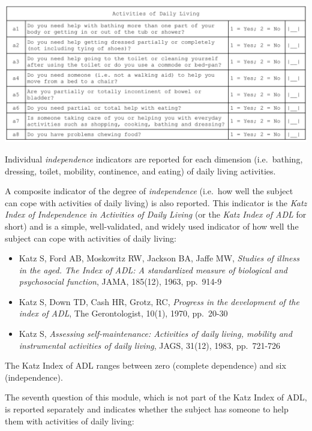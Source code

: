 \documentclass[12pt,a4paper]{book}
\theoremstyle{definition}
\theoremstyle{definition}
\theoremstyle{definition}
\theoremstyle{remark}
\begin{document}
\begin{center}\includegraphics{figures/questionnaire05} \end{center}

Individual \emph{independence} indicators are reported for each
dimension (i.e.~bathing, dressing, toilet, mobility, continence, and
eating) of daily living activities.

A composite indicator of the degree of \emph{independence} (i.e.~how
well the subject can cope with activities of daily living) is also
reported. This indicator is the \emph{Katz Index of Independence in
Activities of Daily Living} (or the \emph{Katz Index of ADL} for short)
and is a simple, well-validated, and widely used indicator of how well
the subject can cope with activities of daily living:

\begin{itemize}
\item
  Katz S, Ford AB, Moskowitz RW, Jackson BA, Jaffe MW, \emph{Studies of
  illness in the aged. The Index of ADL: A standardized measure of
  biological and psychosocial function}, JAMA, 185(12), 1963, pp.~914-9
\item
  Katz S, Down TD, Cash HR, Grotz, RC, \emph{Progress in the development
  of the index of ADL}, The Gerontologist, 10(1), 1970, pp.~20-30
\item
  Katz S, \emph{Assessing self-maintenance: Activities of daily living,
  mobility and instrumental activities of daily living}, JAGS, 31(12),
  1983, pp.~721-726
\end{itemize}

The Katz Index of ADL ranges between zero (complete dependence) and six
(independence).

\newpage

The seventh question of this module, which is not part of the Katz Index
of ADL, is reported separately and indicates whether the subject has
someone to help them with activities of daily living:
\end{document}
